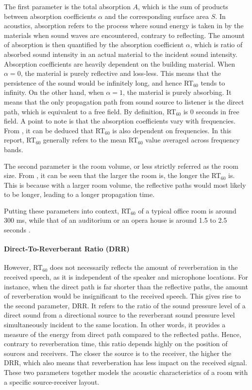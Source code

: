 \documentclass[a4paper,twoside,12pt,hidelinks]{article}
\begin{document}
The first parameter is the total absorption $A$, which is the sum of products between absorption coefficients $\alpha$ and the corresponding surface area $S$. In acoustics, absorption refers to the process where sound energy is taken in by the materials when sound waves are encountered, contrary to reflecting. The amount of absorption is then quantified by the absorption coefficient $\alpha$, which is ratio of absorbed sound intensity in an actual material to the incident sound intensity. Absorption coefficients are heavily dependent on the building material. When $\alpha=0$, the material is purely reflective and loss-less. This means that the persistence of the sound would be infinitely long, and hence RT$_{60}$ tends to infinity. On the other hand, when $\alpha=1$, the material is purely absorbing. It means that the only propagation path from sound source to listener is the direct path, which is equivalent to a free field. By definition, RT$_{60}$ is 0 seconds in free field. A point to note is that the absorption coefficients vary with frequencies. From , it can be deduced that RT$_{60}$ is also dependent on frequencies. In this report, RT$_{60}$ generally refers to the mean RT$_{60}$ value averaged across frequency bands. 

The second parameter is the room volume, or less strictly referred as the room size. From , it can be seen that the larger the room is, the longer the RT$_{60}$ is. This is because with a larger room volume, the reflective paths would most likely to be longer, leading to a longer propagation time. 

Putting these parameters into context, RT$_{60}$ of a typical office room is around 300 ms, while that of an auditorium or an opera house is around 1.5 to 2.5 seconds \cite{White1980PhysicsSound}. 

\paragraph{Direct-To-Reverberant Ratio (DRR)}
However, RT$_{60}$ does not necessarily reflects the amount of reverberation in the received speech, as it is independent of the speaker and microphone locations. For instance, when the direct path is far shorter than the reflective paths, the amount of reverberation would be insignificant to the received speech. This gives rise to the second parameter, DRR. It refers to the ratio of the sound pressure level of a direct sound from a directional source to the reverberant sound pressure level simultaneously incident to the same location. In other words, it provides a measure of the energy from direct path compared to the reflected paths. Hence, contrary to reverberation time, this ratio depends highly on the position of sources and receivers. The closer the source is to the receiver, the higher the DRR, which also means that reverberation has less impact on the received signal. These two parameters together models the acoustic characteristics of a room with a specific source-receiver layout.
\end{document}
